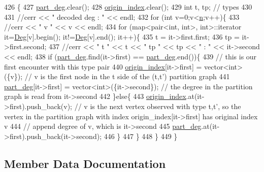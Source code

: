 \begin{DoxyCode}
426 \{
427   \hyperlink{classmarked__graph__decoder_a6882e96fcad9abb10e72f1398814824a}{part\_deg}.clear();
428   \hyperlink{classmarked__graph__decoder_aab3e2f6d4376ba96da32f25aa9ddd069}{origin\_index}.clear();
429   \textcolor{keywordtype}{int} t, tp; \textcolor{comment}{// types}
430 
431   \textcolor{comment}{//cerr << " decoded deg : " << endl;}
432   \textcolor{keywordflow}{for} (\textcolor{keywordtype}{int} v=0;v<\hyperlink{classmarked__graph__decoder_aefc93611bc4a3e9a5d3956d97649a0e9}{n};v++)\{
433     \textcolor{comment}{//cerr << " v " << v << endl;}
434     \textcolor{keywordflow}{for} (map<pair<int, int>, \textcolor{keywordtype}{int}>::iterator it=\hyperlink{classmarked__graph__decoder_a5040ad86467693eab415f615408bfb9e}{Deg}[v].begin(); it!=\hyperlink{classmarked__graph__decoder_a5040ad86467693eab415f615408bfb9e}{Deg}[v].end(); it++)\{
435       t = it->first.first;
436       tp = it->first.second;
437       \textcolor{comment}{//cerr << " t " << t << " tp " << tp << " : " << it->second << endl;}
438       \textcolor{keywordflow}{if} (\hyperlink{classmarked__graph__decoder_a6882e96fcad9abb10e72f1398814824a}{part\_deg}.find(it->first) == \hyperlink{classmarked__graph__decoder_a6882e96fcad9abb10e72f1398814824a}{part\_deg}.end())\{
439         \textcolor{comment}{// this is our first encounter with this type pair}
440         \hyperlink{classmarked__graph__decoder_aab3e2f6d4376ba96da32f25aa9ddd069}{origin\_index}[it->first] = vector<int>(\{v\}); \textcolor{comment}{// v is the first node in the t side of the
       (t,t') partition graph}
441         \hyperlink{classmarked__graph__decoder_a6882e96fcad9abb10e72f1398814824a}{part\_deg}[it->first] = vector<int>(\{it->second\}); \textcolor{comment}{// the degree in the partition graph is
       read from it->second}
442       \}\textcolor{keywordflow}{else}\{
443         \hyperlink{classmarked__graph__decoder_aab3e2f6d4376ba96da32f25aa9ddd069}{origin\_index}.at(it->first).push\_back(v); \textcolor{comment}{// v is the next vertex observed with type
       t,t', so the vertex in the partition graph with index origin\_index[it->first] has original index v }
444         \textcolor{comment}{// append degree of v, which is it->second}
445         \hyperlink{classmarked__graph__decoder_a6882e96fcad9abb10e72f1398814824a}{part\_deg}.at(it->first).push\_back(it->second);
446       \}
447     \}
448   \}
449 \}
\end{DoxyCode}


\subsection{Member Data Documentation}
\mbox{\label{classmarked__graph__decoder_a5040ad86467693eab415f615408bfb9e}} 
